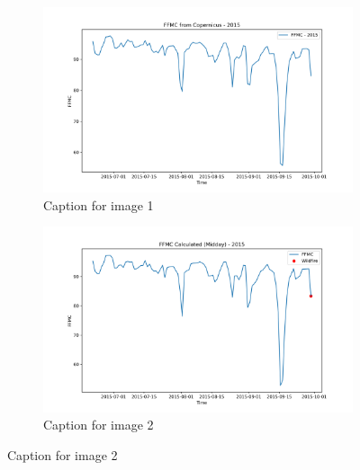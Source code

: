 \begin{figure}[h]
\caption{HELLo}
    \centering
    \begin{subfigure}{0.49\textwidth}
        \centering
        \includegraphics[width=\textwidth]{graphs/2015/2015CopernicusFFMC12.png}
        \caption{Caption for image 1}
        \label{fig:img1}
    \end{subfigure}
    \hfill
    \begin{subfigure}{0.49\textwidth}
        \centering
        \includegraphics[width=\textwidth]{graphs/2015/2015CalcFFMC12.png}
        \caption{Caption for image 2}
        \label{fig:img2}
    \end{subfigure}
    \label{fig:both_images}
\end{figure}

